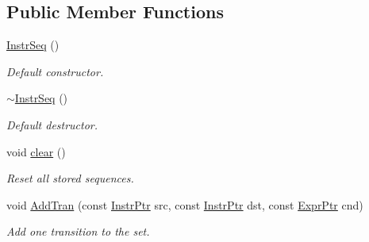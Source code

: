 \subsection*{Public Member Functions}
\begin{DoxyCompactItemize}
\item 
\mbox{\label{classilang_1_1_instr_seq_a5842330b29a7e61153131857121cc6d9}} 
\mbox{\hyperlink{classilang_1_1_instr_seq_a5842330b29a7e61153131857121cc6d9}{Instr\+Seq}} ()
\begin{DoxyCompactList}\small\item\em Default constructor. \end{DoxyCompactList}\item 
\mbox{\label{classilang_1_1_instr_seq_aca968c2827548947b269432341e0acae}} 
\mbox{\hyperlink{classilang_1_1_instr_seq_aca968c2827548947b269432341e0acae}{$\sim$\+Instr\+Seq}} ()
\begin{DoxyCompactList}\small\item\em Default destructor. \end{DoxyCompactList}\item 
\mbox{\label{classilang_1_1_instr_seq_a9a8a95534f7c656d7fca14d5b2de619b}} 
void \mbox{\hyperlink{classilang_1_1_instr_seq_a9a8a95534f7c656d7fca14d5b2de619b}{clear}} ()
\begin{DoxyCompactList}\small\item\em Reset all stored sequences. \end{DoxyCompactList}\item 
\mbox{\label{classilang_1_1_instr_seq_a8aff40b39ca609f3ac31553bc14e4026}} 
void \mbox{\hyperlink{classilang_1_1_instr_seq_a8aff40b39ca609f3ac31553bc14e4026}{Add\+Tran}} (const \mbox{\hyperlink{namespaceilang_af88a19312ae653d687a0d1207bb284f6}{Instr\+Ptr}} src, const \mbox{\hyperlink{namespaceilang_af88a19312ae653d687a0d1207bb284f6}{Instr\+Ptr}} dst, const \mbox{\hyperlink{namespaceilang_a7c4196c72e53ea4df4b7861af7bc3bce}{Expr\+Ptr}} cnd)
\begin{DoxyCompactList}\small\item\em Add one transition to the set. \end{DoxyCompactList}\item 
\mbox{\label{classilang_1_1_instr_seq_afc9b3f34afc96d38e26525ececd5f4a3}} 

\end{DoxyCompactItemize}
